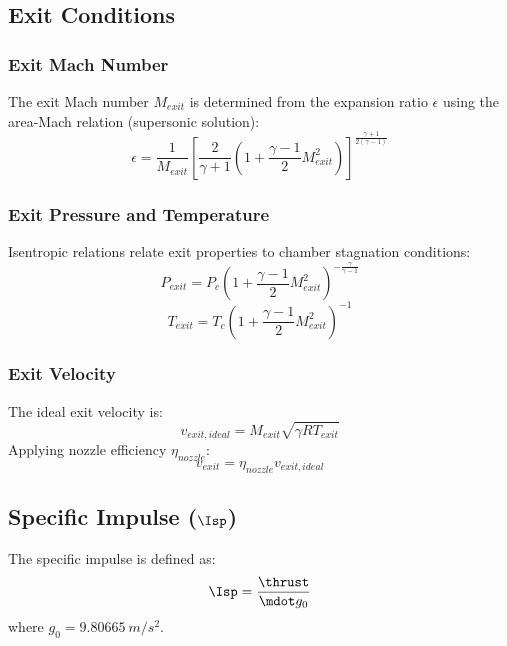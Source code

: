 \subsection{Exit Conditions}

\subsubsection{Exit Mach Number}
The exit Mach number \(M_{exit}\) is determined from the expansion ratio \(\epsilon\) using the area-Mach relation (supersonic solution):
\begin{equation}
\epsilon = \frac{1}{M_{exit}} \left[ \frac{2}{\gamma+1} \left( 1 + \frac{\gamma-1}{2} M_{exit}^2 \right) \right]^{\frac{\gamma+1}{2(\gamma-1)}}
\end{equation}

\subsubsection{Exit Pressure and Temperature}
Isentropic relations relate exit properties to chamber stagnation conditions:
\begin{equation}
P_{exit} = P_c \left( 1 + \frac{\gamma-1}{2} M_{exit}^2 \right)^{-\frac{\gamma}{\gamma-1}}
\end{equation}
\begin{equation}
T_{exit} = T_c \left( 1 + \frac{\gamma-1}{2} M_{exit}^2 \right)^{-1}
\end{equation}

\subsubsection{Exit Velocity}
The ideal exit velocity is:
\begin{equation}
v_{exit,ideal} = M_{exit} \sqrt{\gamma R T_{exit}}
\end{equation}
Applying nozzle efficiency \(\eta_{nozzle}\):
\begin{equation}
v_{exit} = \eta_{nozzle} v_{exit,ideal}
\end{equation}

\subsection{Specific Impulse (\(\Isp\))}
The specific impulse is defined as:
\begin{equation}
\Isp = \frac{\thrust}{\mdot g_0}
\end{equation}
where \(g_0 = \SI{9.80665}{m/s^2}\).

